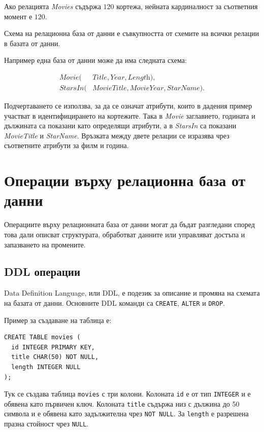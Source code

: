 Ако релацията \textit{Movies} съдържа $120$ кортежа, нейната кардиналност за съответния момент е $120$.

\begin{defn}
Схема на релационна база от данни е съвкупността от схемите на всички релации в базата от данни.
\end{defn}

Например една база от данни може да има следната схема:

\[
\begin{aligned}
\textit{Movie}(&\textit{Title},\textit{Year},\textit{Length}),\\
\textit{StarsIn}(&\textit{MovieTitle},\textit{MovieYear},\textit{StarName}).
\end{aligned}
\]

Подчертаването се използва, за да се означат атрибути, които в дадения пример участват в идентифицирането на кортежите. Така в \textit{Movie} заглавието, годината и дължината са показани като определящи атрибути, а в \textit{StarsIn} са показани \textit{MovieTitle} и \textit{StarName}. Връзката между двете релации се изразява чрез съответните атрибути за филм и година.

\section{Операции върху релационна база от данни}\label{s:23.3}

Операциите върху релационната база от данни могат да бъдат разгледани според това дали описват структурата, обработват данните или управляват достъпа и запазването на промените.

\subsection{DDL операции}\label{s:23.3.1}

Data Definition Language, или DDL, е подезик за описание и промяна на схемата на базата от данни. Основните DDL команди са \texttt{CREATE}, \texttt{ALTER} и \texttt{DROP}.

Пример за създаване на таблица е:

\begin{verbatim}
CREATE TABLE movies (
  id INTEGER PRIMARY KEY,
  title CHAR(50) NOT NULL,
  length INTEGER NULL
);
\end{verbatim}

Тук се създава таблица \texttt{movies} с три колони. Колоната \texttt{id} е от тип \texttt{INTEGER} и е обявена като първичен ключ. Колоната \texttt{title} съдържа низ с дължина до 50 символа и е обявена като задължителна чрез \texttt{NOT NULL}. За \texttt{length} е разрешена празна стойност чрез \texttt{NULL}.

